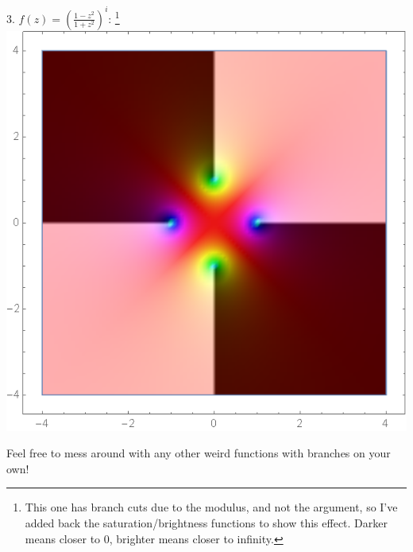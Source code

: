 \begin{center}
    3. $f(z) = \left(\frac{1-z^2}{1+z^2}\right)^i$: \footnote{This one has branch cuts due to the modulus, and not the argument, so I've added back the saturation/brightness functions to show this effect. Darker means closer to 0, brighter means closer to infinity.}\\
    \includegraphics[scale=0.27]{images/weirdpower.png}
\end{center}
Feel free to mess around with any other weird functions with branches on your own!